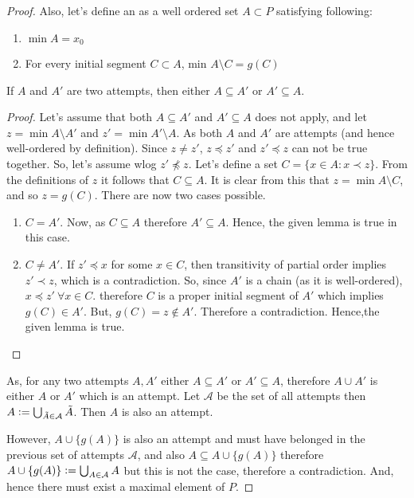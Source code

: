 \documentclass[11pt,a4paper]{article}
\begin{document}
\begin{proof}
    Also, let's define an  as a well ordered set $A \subset P$ satisfying following:
    \begin{enumerate}
        \item $\min A = x_0$
        \item For every  initial segment $C \subset A$, min $A \setminus C = g(C)$
    \end{enumerate}
    
    \begin{lemma}
    If $A$ and $A'$ are two attempts, then either $A \subseteq A'$ or  $A' \subseteq A$.
    \end{lemma}
    
    \begin{proof}
        Let's assume that both $A \subseteq A'$ and $A' \subseteq A$ does not apply, and let $z = \min A \setminus A'$ and $z' = \min A' \setminus A$. As both $A$ and $A'$ are attempts (and hence well-ordered by definition).
        Since $z \neq z'$, $z \preccurlyeq z'$ and $z' \preccurlyeq z$ can not be true together. So, let's assume wlog $z' \not\preccurlyeq z$. Let's define a set $C = \{x \in A : x \prec z\}$. From the definitions of $z$ it follows that $C \subseteq A$. It is clear from this that $z = \min A \setminus C$, and so $z = g(C)$.
        There are now two cases possible.
        \begin{enumerate}
            \item $C = A'$. Now, as $C \subseteq A$ therefore $A' \subseteq A$. Hence, the given lemma is true in this case.
            \item $C \neq A'$. If $z' \preccurlyeq x$ for some $x \in C$, then transitivity of partial order implies $z' \prec z$, which is a contradiction. So, since $A'$ is a chain (as it is well-ordered), $x \preceq z'\ \forall x \in C$. therefore $C$ is a proper initial segment of $A'$ which implies $g(C) \in A'$. But, $g(C) = z \notin A'$. Therefore a contradiction. Hence,the given lemma is true.
        \end{enumerate}
    \end{proof}
    
    As, for any two attempts $A, A'$ either $A \subseteq A'$ or $A' \subseteq A$, therefore $A \cup A'$ is either $A$ or $A'$ which is an attempt. Let $\mathcal{A}$ be the set of all attempts then $A \vcentcolon= \bigcup_{\tilde{A} \in \mathcal{A}} \tilde{A}$. Then $A$ is also an attempt. 
    
    However, $A \cup \{g(A)\}$ is also an attempt and must have belonged in the previous set of attempts $\mathcal{A}$, and also $A \subseteq A \cup \{g(A)\}$ therefore $A \cup \{g(A)\} \vcentcolon= \bigcup_{A \in \mathcal{A}} A$ but this is not the case, therefore a contradiction. And, hence there must exist a maximal element of $P$.
\end{proof}
\end{document}
